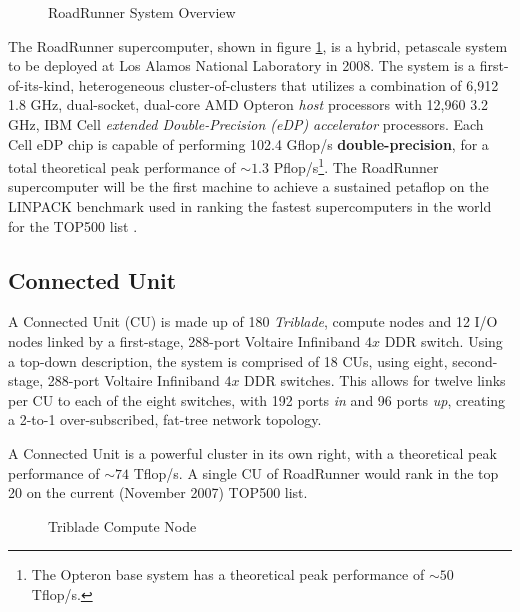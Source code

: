 \documentclass[letter,10pt]{article}
\begin{document}
\begin{figure}
    \begin{center}
    \scalebox{0.3}{}
    \caption{RoadRunner System Overview}
    \label{fig:system}
    \end{center}
\end{figure}

The RoadRunner supercomputer, shown in figure \ref{fig:system}, is a hybrid, petascale system to be deployed at Los Alamos National Laboratory in 2008.  The system is a first-of-its-kind, heterogeneous cluster-of-clusters that utilizes a combination of 6,912 1.8 GHz, dual-socket, dual-core AMD Opteron \emph{host} processors with 12,960 3.2 GHz, IBM Cell \emph{extended Double-Precision (eDP)} \emph{accelerator} processors.  Each Cell eDP chip is capable of performing 102.4 Gflop/s \textbf{double-precision}, for a total theoretical peak performance of $\sim1.3$ Pflop/s\footnote{The Opteron base system has a theoretical peak performance of $\sim50$ Tflop/s.}.  The RoadRunner supercomputer will be the first machine to achieve a sustained petaflop on the LINPACK benchmark used in ranking the fastest supercomputers in the world for the TOP500 list \cite{top500}.

\subsection*{Connected Unit}

A Connected Unit (CU) is made up of 180 \emph{Triblade}, compute nodes and 12 I/O nodes linked by a first-stage, 288-port Voltaire Infiniband $4x$ DDR switch.  Using a top-down description, the system is comprised of 18 CUs, using eight, second-stage, 288-port Voltaire Infiniband $4x$ DDR switches.  This allows for twelve links per CU to each of the eight switches, with 192 ports \emph{in} and 96 ports \emph{up}, creating a 2-to-1 over-subscribed, fat-tree network topology.

A Connected Unit is a powerful cluster in its own right, with a theoretical peak performance of $\sim74$ Tflop/s.  A single CU of RoadRunner would rank in the top 20 on the current (November 2007) TOP500 list.

\begin{figure}
    \begin{center}
    \scalebox{0.2}{}
    \caption{Triblade Compute Node}
    \label{fig:triblade}
    \end{center}
\end{figure}
\end{document}
